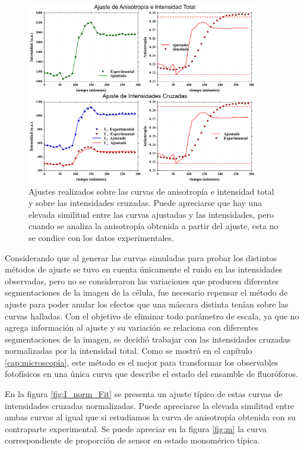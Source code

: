 \begin{figure}
    \centering
    \includegraphics[width=0.9\textwidth]{./img/Cap4/Bad_Fits.png}
    \caption{Ajustes realizados sobre las curvas de anisotropía e intensidad total y sobre las intensidades cruzadas. Puede apreciarse que hay una elevada similitud entre las curvas ajustadas y las intensidades, pero cuando se analiza la anisotropía obtenida a partir del ajuste, esta no se condice con los datos experimentales.}
    \label{fig:Bad_Fits}
\end{figure}

Considerando que al generar las curvas simuladas para probar los distintos métodos de ajuste se tuvo en cuenta únicamente el ruido en las intensidades observadas, pero no se consideraron las variaciones que producen diferentes segmentaciones de la imagen de la célula, fue necesario repensar el método de ajuste para poder anular los efectos que una máscara distinta tenían sobre las curvas halladas. Con el objetivo de eliminar todo parámetro de escala, ya que no agrega información al ajuste y su variación se relaciona con diferentes segmentaciones de la imagen, se decidió trabajar con las intensidades cruzadas normalizadas por la intensidad total. Como se mostró en el capítulo \ref{cap:microscopia}, este método es el mejor para transformar los observables fotofísicos en una única curva que describe el estado del ensamble de fluoróforos.

En la figura \ref{fig:I_norm_Fit} se presenta un ajuste típico de estas curvas de intensidades cruzadas normalizadas. Puede apreciarse la elevada similitud entre ambas curvas al igual que si estudiamos la curva de anisotropía obtenida con su contraparte experimental. Se puede apreciar en la figura \ref{fig:m} la curva correspondiente de proporción de sensor en estado monomérico típica.

